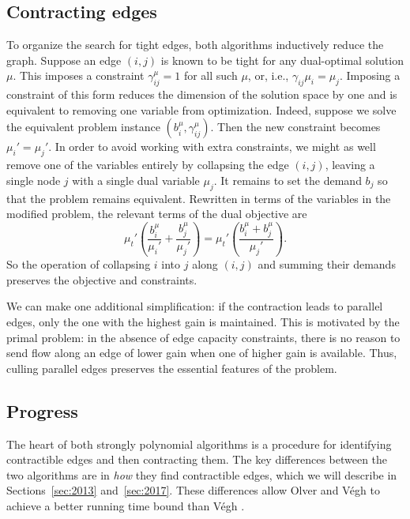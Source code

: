 \documentclass[11pt]{article}
\theoremstyle{definition}
\theoremstyle{definition}
\theoremstyle{definition}
\newcommand{\biu}{b_{i}^{\mu}}
\newcommand{\gij}{\gamma_{ij}}
\newcommand{\giij}{\gamma_{ij}^{\mu}}
\begin{document}
    \subsection{Contracting edges}\label{sec:contract}
    To organize the search for tight edges, both algorithms inductively reduce the graph.
    Suppose an edge $(i, j)$ is known to be tight for any dual-optimal solution $\mu$. This
    imposes a constraint $\giij = 1$ for all such $\mu$, or, i.e., $\gij \mu_i = \mu_j$.
    Imposing a constraint of this form reduces the dimension of the solution
    space by one and is equivalent to removing one variable from optimization. Indeed,
    suppose we solve the equivalent problem instance $(\biu, \giij)$. Then the new constraint
    becomes $\mu_i' = \mu_j'$. In order to avoid working with extra constraints, we might
    as well remove one of the variables entirely by collapsing the edge $(i, j)$, leaving a single
    node $j$ with a single dual variable $\mu_j$. It remains to set the demand $b_j$ so
    that the problem remains equivalent. Rewritten in terms of the variables in
    the modified problem, the relevant terms of the dual objective are
    \[ \mu_t' \left(\frac{b_i^\mu}{\mu_i'} + \frac{b_j^\mu}{\mu_j'}\right)
     = \mu_t' \left(\frac{b_i^\mu + b_j^\mu}{\mu_j'}\right). \]
	So the operation of collapsing $i$ into $j$ along $(i, j)$ and summing their demands
	preserves the objective and constraints.
	
	We can make one additional simplification: if the contraction leads to parallel edges,
	only the one with the highest gain is maintained. This is motivated by the primal problem: in
	the absence of edge capacity constraints, there is no reason to send flow along an edge of
	lower gain when one of higher gain is available. Thus, culling parallel edges preserves the
	essential features of the problem.
	
	\subsection{Progress}

	The heart of both strongly polynomial algorithms is a procedure for
	identifying contractible edges and then contracting them. The key
	differences between the two algorithms are in 
	\textit{how} they find contractible edges, which
	we will describe in Sections~\ref{sec:2013} and~\ref{sec:2017}. These differences
	allow Olver and Végh \cite{Olver2017} to achieve a better running time bound than
	Végh \cite{Vegh2013}.
\end{document}
